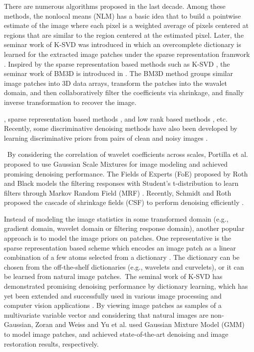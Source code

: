 There are numerous algorithms proposed in the last decade. Among these methods, the nonlocal means (NLM) \cite{nlm} has a basic idea that to build a pointwise estimate of the image where each pixel is a weighted average of pixels centered at regions that are similar to the region centered at the estimated pixel. Later, the seminar work of K-SVD \cite{ksvd} was introduced in which an overcomplete dictionary is learned for the extracted image patches under the sparse representation framwork \cite{olshausen1997sparse,olshausen1996emergence}. Inspired by the sparse representation based methods such as K-SVD \cite{ksvd}, the seminar work of BM3D is introduced in \cite{bm3d}. The BM3D method groups similar image patches into 3D data arrays, transform the  patches into the wavalet domain, and then collaboratively filter the coefficients via shrinkage, and finally inverse transformation to recover the image.


, sparse representation based methods \cite{ksvd,lssc,ncsr}, and low rank based methods \cite{nnm,wnnm}, etc. Recently, some discriminative denoising methods have also been developed by learning discriminative priors from pairs of clean and noisy images \cite{mlp,csf,tnrd}.

\ By considering the correlation of wavelet coefficients across scales, Portilla et al. \cite{blsgsm} proposed to use Gaussian Scale Mixtures for image modeling and achieved promising denoising performance.  The Fields of Experts (FoE) \cite{foe} proposed by Roth and Black models the filtering responses with Student's t-distribution to learn filters through Markov Random Field (MRF) \cite{Bishop}. Recently, Schmidt and Roth proposed the cascade of shrinkage fields (CSF) to perform denoising efficiently \cite{csf}.

Instead of modeling the image statistics in some transformed domain (e.g., gradient domain, wavelet domain or filtering response domain), another popular approach is to model the image priors on patches. One representative is the sparse representation based scheme which encodes an image patch as a linear combination of a few atoms selected from a dictionary \cite{olshausen1996emergence,olshausen1997sparse,ksvd}. The dictionary can be chosen from the off-the-shelf dictionaries (e.g., wavelets and curvelets), or it can be learned from natural image patches.\ The seminal work of K-SVD \cite{ksvdtsp,ksvd} has demonstrated promising denoising performance by dictionary learning, which has yet been extended and successfully used in various image processing and computer vision applications \cite{srcolor,srcvpr,lcksvd}. By viewing image patches as samples of a multivariate variable vector and considering that natural images are non-Gaussian, Zoran and Weiss \cite{epll,gmmnips} and Yu et al.  \cite{ple} used Gaussian Mixture Model (GMM) to model image patches, and achieved state-of-the-art denoising and image restoration results, respectively.

